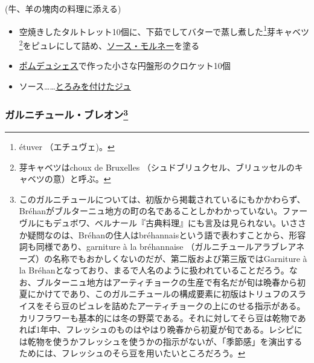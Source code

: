 \begin{recette}


(牛、羊の塊肉の料理に添える)

\begin{itemize}
\item
  空焼きしたタルトレット10個に、下茹でしてバターで蒸し煮した\footnote{étuver
    （エチュヴェ)。}芽キャベツ\footnote{芽キャベツはchoux de Bruxelles
    （シュドブリュクセル、ブリュッセルのキャベツの意）と呼ぶ。}をピュレにして詰め、\protect\hyperlink{sauce-mornay}{ソース・モルネー}を塗る
\item
  \protect\hyperlink{pommes-de-terre-duchesse}{ポムデュシェス}で作った小さな円盤形のクロケット10個
\item
  ソース\ldots{}\ldots{}\protect\hyperlink{jus-de-veau-lie}{とろみを付けたジュ}
\end{itemize}

\hypertarget{garniture-brehan}{%
\subsubsection[ガルニチュール・ブレオン]{\texorpdfstring{ガルニチュール・ブレオン\footnote{このガルニチュールについては、初版から掲載されているにもかかわらず、Bréhanがブルターニュ地方の町の名であることしかわかっていない。ファーヴルにもデュボワ、ベルナール『古典料理』にも言及は見られない。いささか疑問なのは、Bréhanの住人はbréhannaisという語で表わすことから、形容詞も同様であり、garniture
  à la bréhannaise
  （ガルニチュールアラブレアネーズ）の名称でもおかしくないのだが、第二版および第三版ではGarniture
  à la
  Bréhanとなっており、まるで人名のように扱われていることだろう。なお、ブルターニュ地方はアーティチョークの生産で有名だが旬は晩春から初夏にかけてであり、このガルニチュールの構成要素に初版はトリュフのスライスをそら豆のピュレを詰めたアーティチョークの上にのせる指示がある。カリフラワーも基本的には冬の野菜である。それに対してそら豆は乾物であれば1年中、フレッシュのものはやはり晩春から初夏が旬である。レシピには乾物を使うかフレッシュを使うかの指示がないが、「季節感」を演出するためには、フレッシュのそら豆を用いたいところだろう。}}{ガルニチュール・ブレオン}}\label{garniture-brehan}}




\end{recette}
